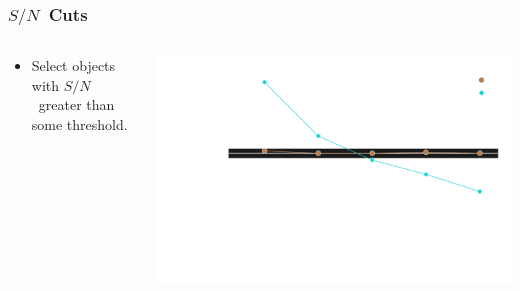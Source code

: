 \documentclass{beamer}
\newcommand{\snr}{$S/N$}
\begin{document}
\frame
{
    \frametitle{\snr\ Cuts}
 

    \begin{columns}
        \begin{column}{0.4\textwidth}
            \begin{itemize}
                \item Select objects with \snr\ greater than some threshold.
            \end{itemize}
        \end{column}
        \begin{column}{0.6\textwidth}
            \begin{center}
            \includegraphics[width=\textwidth]{mc-select-bias-thresh-with-nocorr-inv.pdf}
                \newline
            \end{center}
        \end{column}
    \end{columns}


}
\end{document}
